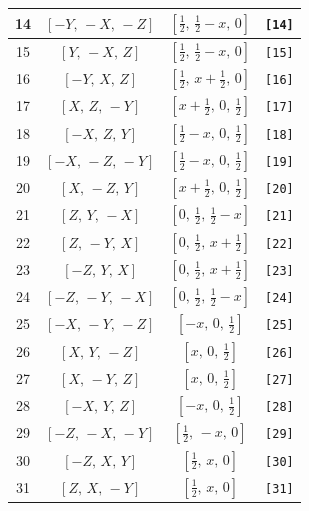 \documentclass[fleqn,8pt]{jsarticle}
\begin{document}
\begin{longtable}{cccc}
14 & $\left[ - Y,\, - X,\, - Z \right]$ & $\left[ \frac{1}{2},\, \frac{1}{2} - x,\, 0 \right]$ & {\tt [14]} \\ \hline
15 & $\left[ Y,\, - X,\, Z \right]$ & $\left[ \frac{1}{2},\, \frac{1}{2} - x,\, 0 \right]$ & {\tt [15]} \\ \hline
16 & $\left[ - Y,\, X,\, Z \right]$ & $\left[ \frac{1}{2},\, x + \frac{1}{2},\, 0 \right]$ & {\tt [16]} \\ \hline
17 & $\left[ X,\, Z,\, - Y \right]$ & $\left[ x + \frac{1}{2},\, 0,\, \frac{1}{2} \right]$ & {\tt [17]} \\ \hline
18 & $\left[ - X,\, Z,\, Y \right]$ & $\left[ \frac{1}{2} - x,\, 0,\, \frac{1}{2} \right]$ & {\tt [18]} \\ \hline
19 & $\left[ - X,\, - Z,\, - Y \right]$ & $\left[ \frac{1}{2} - x,\, 0,\, \frac{1}{2} \right]$ & {\tt [19]} \\ \hline
20 & $\left[ X,\, - Z,\, Y \right]$ & $\left[ x + \frac{1}{2},\, 0,\, \frac{1}{2} \right]$ & {\tt [20]} \\ \hline
21 & $\left[ Z,\, Y,\, - X \right]$ & $\left[ 0,\, \frac{1}{2},\, \frac{1}{2} - x \right]$ & {\tt [21]} \\ \hline
22 & $\left[ Z,\, - Y,\, X \right]$ & $\left[ 0,\, \frac{1}{2},\, x + \frac{1}{2} \right]$ & {\tt [22]} \\ \hline
23 & $\left[ - Z,\, Y,\, X \right]$ & $\left[ 0,\, \frac{1}{2},\, x + \frac{1}{2} \right]$ & {\tt [23]} \\ \hline
24 & $\left[ - Z,\, - Y,\, - X \right]$ & $\left[ 0,\, \frac{1}{2},\, \frac{1}{2} - x \right]$ & {\tt [24]} \\ \hline
25 & $\left[ - X,\, - Y,\, - Z \right]$ & $\left[ - x,\, 0,\, \frac{1}{2} \right]$ & {\tt [25]} \\ \hline
26 & $\left[ X,\, Y,\, - Z \right]$ & $\left[ x,\, 0,\, \frac{1}{2} \right]$ & {\tt [26]} \\ \hline
27 & $\left[ X,\, - Y,\, Z \right]$ & $\left[ x,\, 0,\, \frac{1}{2} \right]$ & {\tt [27]} \\ \hline
28 & $\left[ - X,\, Y,\, Z \right]$ & $\left[ - x,\, 0,\, \frac{1}{2} \right]$ & {\tt [28]} \\ \hline
29 & $\left[ - Z,\, - X,\, - Y \right]$ & $\left[ \frac{1}{2},\, - x,\, 0 \right]$ & {\tt [29]} \\ \hline
30 & $\left[ - Z,\, X,\, Y \right]$ & $\left[ \frac{1}{2},\, x,\, 0 \right]$ & {\tt [30]} \\ \hline
31 & $\left[ Z,\, X,\, - Y \right]$ & $\left[ \frac{1}{2},\, x,\, 0 \right]$ & {\tt [31]} \\ \hline

\end{longtable}
\end{document}
